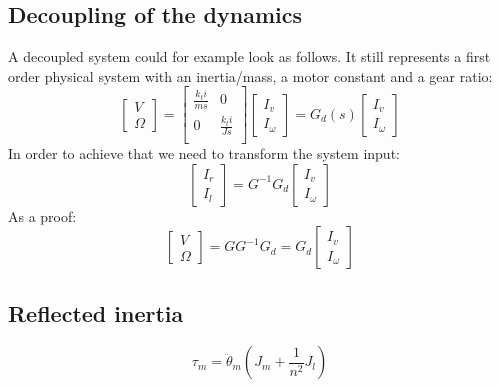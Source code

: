 \documentclass[a4paper, 11pt]{article}
\begin{document}
\subsection{Decoupling of the dynamics}
A decoupled system could for example look as follows. It still represents a first order physical system with an inertia/mass, a motor constant and a gear ratio:
\begin{equation}
\begin{bmatrix}
V\\
\Omega
\end{bmatrix}
= 
\begin{bmatrix}
\frac{k_t i}{m s} & 0\\[8pt]
0 &\frac{k_t i}{J s}\\
\end{bmatrix}
\begin{bmatrix}
I_v\\
I_{\omega}
\end{bmatrix}
= G_d(s)
\begin{bmatrix}
I_v\\
I_{\omega}
\end{bmatrix}
\end{equation}
In order to achieve that we need to transform the system input:
\begin{equation}
\begin{bmatrix}
I_r\\
I_l
\end{bmatrix}
= G^{-1}G_d 
\begin{bmatrix}
I_v\\
I_{\omega}
\end{bmatrix}
\end{equation}
As a proof:
\begin{equation}
\begin{bmatrix}
V \\
\Omega
\end{bmatrix}
= G G^{-1}G_d  = G_d
\begin{bmatrix}
I_v\\
I_{\omega}
\end{bmatrix}
\end{equation}

\subsection{Reflected inertia}
\begin{equation}
	\tau_m = \ddot{\theta}_m(J_m + \frac{1}{n^2}J_l)
\end{equation}
\end{document}
